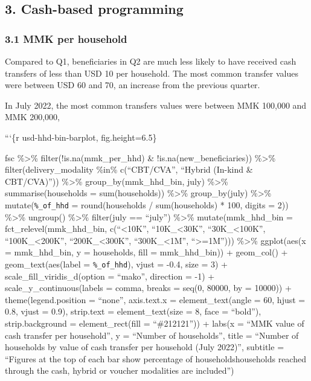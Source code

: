 \documentclass[
]{article}
\begin{document}
\hypertarget{cash-based-programming}{%
\subsection{3. Cash-based programming}\label{cash-based-programming}}

\hypertarget{mmk-per-household}{%
\subsubsection{3.1 MMK per household}\label{mmk-per-household}}

Compared to Q1, beneficiaries in Q2 are much less likely to have
received cash transfers of less than USD 10 per household. The most
common transfer values were between USD 60 and 70, an increase from the
previous quarter.

In July 2022, the most common transfers values were between MMK 100,000
and MMK 200,000,

```\{r usd-hhd-bin-barplot, fig.height=6.5\}

fsc \%\textgreater\% filter(!is.na(mmk\_per\_hhd) \&
!is.na(new\_beneficiaries)) \%\textgreater\% filter(delivery\_modality
\%in\% c(``CBT/CVA'', ``Hybrid (In-kind \& CBT/CVA)'')) \%\textgreater\%
group\_by(mmk\_hhd\_bin, july) \%\textgreater\% summarise(households =
sum(households)) \%\textgreater\% group\_by(july) \%\textgreater\%
mutate(\texttt{\%\_of\_hhd} = round(households / sum(households) * 100,
digits = 2)) \%\textgreater\% ungroup() \%\textgreater\% filter(july ==
``july'') \%\textgreater\% mutate(mmk\_hhd\_bin =
fct\_relevel(mmk\_hhd\_bin, c(``\textless10K'', ``10K\_\textless30K'',
``30K\_\textless100K'', ``100K\_\textless200K'',
``200K\_\textless300K'', ``300K\_\textless1M'', ``\textgreater=1M'')))
\%\textgreater\% ggplot(aes(x = mmk\_hhd\_bin, y = households, fill =
mmk\_hhd\_bin)) + geom\_col() + geom\_text(aes(label =
\texttt{\%\_of\_hhd}), vjust = -0.4, size = 3) +
scale\_fill\_viridis\_d(option = ``mako'', direction = -1) +
scale\_y\_continuous(labels = comma, breaks = seq(0, 80000, by = 10000))
+ theme(legend.position = ``none'', axis.text.x = element\_text(angle =
60, hjust = 0.8, vjust = 0.9), strip.text = element\_text(size = 8, face
= ``bold''), strip.background = element\_rect(fill = ``\#212121'')) +
labs(x = ``MMK value of cash transfer per household'', y = ``Number of
households'', title = ``Number of households by value of cash transfer
per household (July 2022)'', subtitle = ``Figures at the top of each bar
show percentage of households\nOnly households reached through the cash,
hybrid or voucher modalities are included'')
\end{document}
